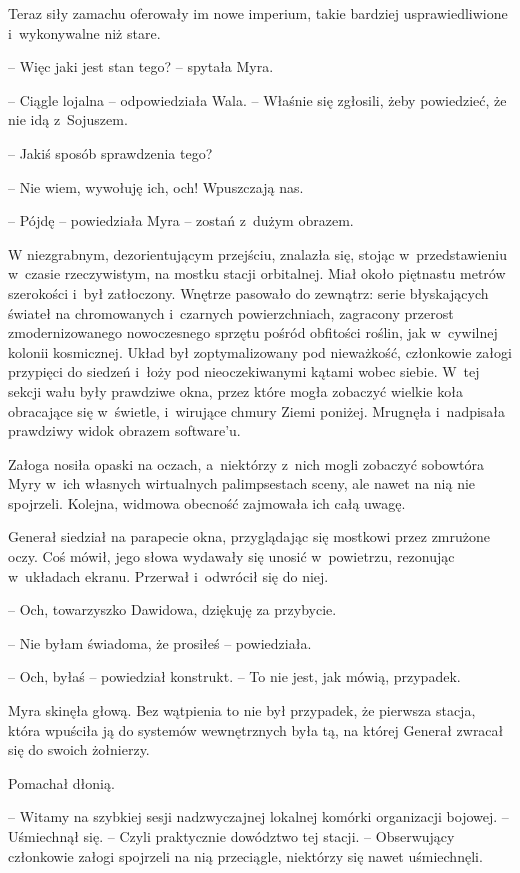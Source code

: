 \documentclass[oneside,polish,11pt,sfheadings]{mwbk}
\begin{document}
Teraz siły zamachu oferowały im nowe imperium, takie bardziej
usprawiedliwione i~wykonywalne niż stare.

-- Więc jaki jest stan tego? -- spytała Myra.

-- Ciągle lojalna -- odpowiedziała Wala. -- Właśnie się zgłosili, żeby
powiedzieć, że nie idą z~Sojuszem.

-- Jakiś sposób sprawdzenia tego?

-- Nie wiem, wywołuję ich, och! Wpuszczają nas.

-- Pójdę -- powiedziała Myra -- zostań z~dużym obrazem.

W niezgrabnym, dezorientującym przejściu, znalazła się, stojąc w~przedstawieniu w~czasie rzeczywistym, na mostku stacji orbitalnej. Miał
około piętnastu metrów szerokości i~był zatłoczony. Wnętrze pasowało do
zewnątrz: serie błyskających świateł na chromowanych i~czarnych
powierzchniach, zagracony przerost zmodernizowanego nowoczesnego sprzętu
pośród obfitości roślin, jak w~cywilnej kolonii kosmicznej. Układ był
zoptymalizowany pod nieważkość, członkowie załogi przypięci do siedzeń i~łoży pod nieoczekiwanymi kątami wobec siebie. W~tej sekcji wału były
prawdziwe okna, przez które mogła zobaczyć wielkie koła obracające się w~świetle, i~wirujące chmury Ziemi poniżej. Mrugnęła i~nadpisała prawdziwy
widok obrazem software'u.

Załoga nosiła opaski na oczach, a~niektórzy z~nich mogli zobaczyć
sobowtóra Myry w~ich własnych wirtualnych palimpsestach sceny, ale nawet
na nią nie spojrzeli. Kolejna, widmowa obecność zajmowała ich całą
uwagę.

Generał siedział na parapecie okna, przyglądając się mostkowi przez
zmrużone oczy. Coś mówił, jego słowa wydawały się unosić w~powietrzu,
rezonując w~układach ekranu. Przerwał i~odwrócił się do niej.

-- Och, towarzyszko Dawidowa, dziękuję za przybycie.

-- Nie byłam świadoma, że prosiłeś -- powiedziała.

-- Och, byłaś -- powiedział konstrukt. -- To nie jest, jak mówią,
przypadek.

Myra skinęła głową. Bez wątpienia to nie był przypadek, że pierwsza
stacja, która wpuściła ją do systemów wewnętrznych była tą, na której
Generał zwracał się do swoich żołnierzy.

Pomachał dłonią. 

-- Witamy na szybkiej sesji nadzwyczajnej lokalnej
komórki organizacji bojowej. -- Uśmiechnął się. -- Czyli praktycznie
dowództwo tej stacji. -- Obserwujący członkowie załogi spojrzeli na nią
przeciągle, niektórzy się nawet uśmiechnęli.
\end{document}
